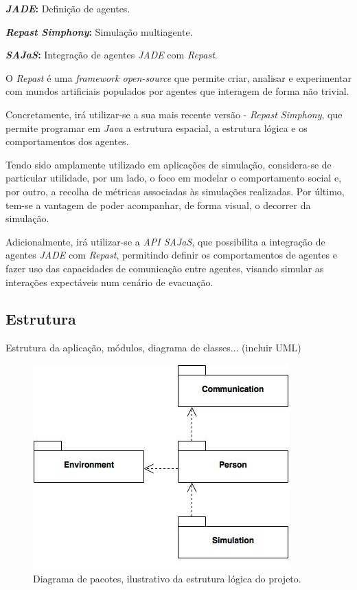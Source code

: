 \documentclass[12pt]{article}
\begin{document}
\begin{titlepage}
\textbf{\textit{JADE}:} Definição de agentes.

\textbf{\textit{Repast Simphony}:} Simulação multiagente.

\textbf{\textit{SAJaS}:} Integração de agentes \textit{JADE} com \textit{Repast}.
\newline

O \textit{Repast} é uma \textit{framework open-source} que permite criar, analisar e experimentar com mundos artificiais populados por agentes que interagem de forma não trivial.

Concretamente, irá utilizar-se a sua mais recente versão - \textit{Repast Simphony}, que permite programar em \textit{Java} a estrutura espacial, a estrutura lógica e os comportamentos dos agentes.

Tendo sido amplamente utilizado em aplicações de simulação, considera-se de particular utilidade, por um lado, o foco em modelar o comportamento social e, por outro, a recolha de métricas associadas às simulações realizadas. Por último, tem-se a vantagem de poder acompanhar, de forma visual, o decorrer da simulação.

Adicionalmente, irá utilizar-se a \textit{API SAJaS}, que possibilita a integração de agentes \textit{JADE} com \textit{Repast}, permitindo definir os comportamentos de agentes e fazer uso das capacidades de comunicação entre agentes, visando simular as interações expectáveis num cenário de evacuação.

\subsection{Estrutura}

Estrutura da aplicação, módulos, diagrama de classes...
(incluir UML)

\begin{figure}[H]
	\centering
	\includegraphics[scale=0.5]{packages.jpg}
	\caption{Diagrama de pacotes, ilustrativo da estrutura lógica do projeto.}
	\label{uml}
\end{figure}


\end{titlepage}
\end{document}
